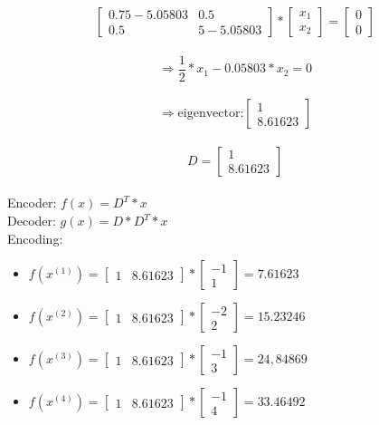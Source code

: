 \documentclass[12pt]{article}
\begin{document}
\begin{enumerate}[a)]
        		$$ \begin{bmatrix} 0.75-5.05803 & 0.5 \\ 0.5 & 5-5.05803 \end{bmatrix}* \begin{bmatrix} x_1 \\ x_2 \end{bmatrix}
        		=\begin{bmatrix} 0 \\ 0 \end{bmatrix} $$\\
        		$$ \Rightarrow \frac{1}{2}*x_1 - 0.05803*x_2= 0 $$\\ 
        		$$ \Rightarrow  \text{eigenvector:}  \begin{bmatrix} 1 \\ 8.61623 \end{bmatrix} $$\\
        		$$ D= \begin{bmatrix} 1 \\ 8.61623 \end{bmatrix} $$\\
        		Encoder: $f(x)= D^T * x$\\
        		Decoder: $g(x)= D* D^T *x$\\
        		Encoding:\\
        		\begin{itemize}
        			\item $f(x^{(1)})= \begin{bmatrix} 1 & 8.61623  \end{bmatrix} * \begin{bmatrix} -1 \\ 1 \end{bmatrix} = 7.61623$
        			\item $f(x^{(2)})= \begin{bmatrix} 1 & 8.61623  \end{bmatrix} * \begin{bmatrix} -2 \\ 2 \end{bmatrix} = 15.23246$
        			\item $f(x^{(3)})= \begin{bmatrix} 1 & 8.61623  \end{bmatrix} * \begin{bmatrix} -1 \\ 3 \end{bmatrix} = 24,84869$
        			\item $f(x^{(4)})= \begin{bmatrix} 1 & 8.61623  \end{bmatrix} * \begin{bmatrix} -1 \\ 4 \end{bmatrix} = 33.46492$

\end{itemize}
\end{enumerate}
\end{document}
